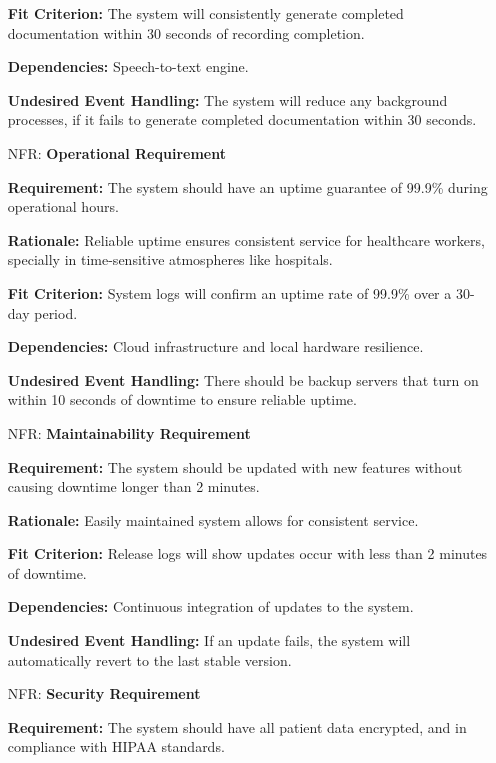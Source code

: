 \documentclass[12pt]{article}
\newcounter{nfrnum} %
\begin{document}
\begin{itemize}
    \textbf{Fit Criterion:} The system will consistently generate completed documentation within 30 seconds of recording completion.  

    \textbf{Dependencies:} Speech-to-text engine.  

    \textbf{Undesired Event Handling:} The system will reduce any background processes, if it fails to generate completed documentation within 30 seconds.

\item[NFR\refstepcounter{nfrnum}\thenfrnum \label{NFR_Operational}:] \textbf{Operational Requirement}

    \textbf{Requirement:} The system should have an uptime guarantee of 99.9\% during operational hours.

    \textbf{Rationale:} Reliable uptime ensures consistent service for healthcare workers, specially in time-sensitive atmospheres like hospitals.

    \textbf{Fit Criterion:} System logs will confirm an uptime rate of 99.9\% over a 30-day period.  

    \textbf{Dependencies:} Cloud infrastructure and local hardware resilience. 
    
    \textbf{Undesired Event Handling:} There should be backup servers that turn on within 10 seconds of downtime to ensure reliable uptime.

\item[NFR\refstepcounter{nfrnum}\thenfrnum \label{NFR_Maintainability}:] \textbf{Maintainability Requirement}

    \textbf{Requirement:} The system should be updated with new features without causing downtime longer than 2 minutes.

    \textbf{Rationale:} Easily maintained system allows for consistent service.

    \textbf{Fit Criterion:} Release logs will show updates occur with less than 2 minutes of downtime.  

    \textbf{Dependencies:} Continuous integration of updates to the system.  

    \textbf{Undesired Event Handling:} If an update fails, the system will automatically revert to the last stable version.

\item[NFR\refstepcounter{nfrnum}\thenfrnum \label{NFR_Security}:] \textbf{Security Requirement}

    \textbf{Requirement:} The system should have all patient data encrypted, and in compliance with HIPAA standards.


\end{itemize}
\end{document}
